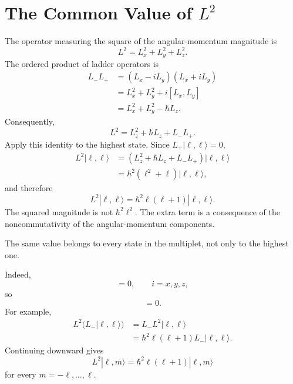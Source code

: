 \section{The Common Value of \(L^2\)}

The operator measuring the square of the angular-momentum magnitude is
\begin{equation}
L^2=L_x^2+L_y^2+L_z^2.
\end{equation}
The ordered product of ladder operators is
\begin{align}
L_-L_+
&=(L_x-iL_y)(L_x+iL_y) \\
&=L_x^2+L_y^2+i[L_x,L_y] \\
&=L_x^2+L_y^2-\hbar L_z.
\end{align}
Consequently,
\begin{equation}
L^2=L_z^2+\hbar L_z+L_-L_+.
\end{equation}
Apply this identity to the highest state. Since \(L_+|\ell,\ell\rangle=0\),
\begin{align}
L^2|\ell,\ell\rangle
&=\left(L_z^2+\hbar L_z+L_-L_+\right)|\ell,\ell\rangle \\
&=\hbar^2\left(\ell^2+\ell\right)|\ell,\ell\rangle,
\end{align}
and therefore
\begin{equation}
L^2|\ell,\ell\rangle
=\hbar^2\ell(\ell+1)|\ell,\ell\rangle.
\end{equation}
The squared magnitude is not \(\hbar^2\ell^2\). The extra term is a consequence of the noncommutativity of the angular-momentum components.

The same value belongs to every state in the multiplet, not only to the highest one.

\begin{classroomqa}
\end{classroomqa}

Indeed,
\begin{equation}
[L^2,L_i]=0,
\qquad i=x,y,z,
\end{equation}
so
\begin{equation}
[L^2,L_\pm]=0.
\end{equation}
For example,
\begin{align}
L^2\bigl(L_-|\ell,\ell\rangle\bigr)
&=L_-L^2|\ell,\ell\rangle \\
&=\hbar^2\ell(\ell+1)L_-|\ell,\ell\rangle.
\end{align}
Continuing downward gives
\begin{equation}
L^2|\ell,m\rangle
=\hbar^2\ell(\ell+1)|\ell,m\rangle
\end{equation}
for every \(m=-\ell,\ldots,\ell\).

